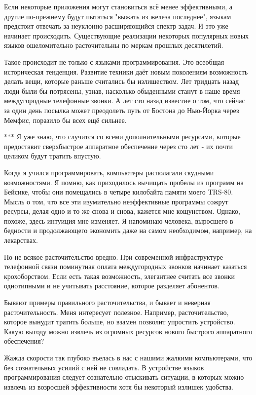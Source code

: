\documentclass[ebook,12pt,oneside,openany]{memoir}
\begin{document}
Если некоторые приложения могут становиться всё менее эффективными, а
другие по-прежнему будут пытаться "выжать из железа последнее", языкам
предстоит отвечать за неуклонно расширяющийся спектр задач. И это уже
начинает происходить. Существующие реализации некоторых популярных
новых языков ошеломительно расточительны по меркам прошлых
десятилетий.

Такое происходит не только с языками программирования. Это всеобщая
историческая тенденция. Развитие техники даёт новым поколениям
возможность делать вещи, которые раньше считались бы излишеством. Лет
тридцать назад люди были бы потрясены, узнав, насколько обыденными
станут в наше время междугородные телефонные звонки. А лет сто назад
известие о том, что сейчас за один день посылка может преодолеть путь
от Бостона до Нью-Йорка через Мемфис, поразило бы всех ещё сильнее.

*** Я уже знаю, что случится со всеми дополнительными ресурсами,
которые предоставит сверхбыстрое аппаратное обеспечение через сто лет
- их почти целиком будут тратить впустую.

Когда я учился программировать, компьютеры располагали скудными
возможностями. Я помню, как приходилось вычищать пробелы из программ
на Бейсике, чтобы они помещались в четыре килобайта памяти моего
TRS-80. Мысль о том, что все эти изумительно неэффективные программы
сожрут ресурсы, делая одно и то же снова и снова, кажется мне
кощунством. Однако, похоже, здесь интуиция мне изменяет. Я напоминаю
человека, выросшего в бедности и продолжающего экономить даже на самом
необходимом, например, на лекарствах.

Но не всякое расточительство вредно. При современной инфраструктуре
телефонной связи поминутная оплата междугородных звонков начинает
казаться крохоборством. Если есть такая возможность, элегантнее
считать все звонки однотипными и не учитывать расстояние, которое
разделяет абонентов.

Бывают примеры правильного расточительства, и бывает и неверная
расточительность. Меня интересует полезное. Например, расточительство,
которое вынудит тратить больше, но взамен позволит упростить
устройство. Какую выгоду можно извлечь из огромных ресурсов нового
быстрого аппаратного обеспечения?

Жажда скорости так глубоко въелась в нас с нашими жалкими
компьютерами, что без сознательных усилий с ней не совладать. В
устройстве языков программирования следует сознательно отыскивать
ситуации, в которых можно извлечь из возросшей эффективности хотя бы
некоторый излишек удобства.
\end{document}
